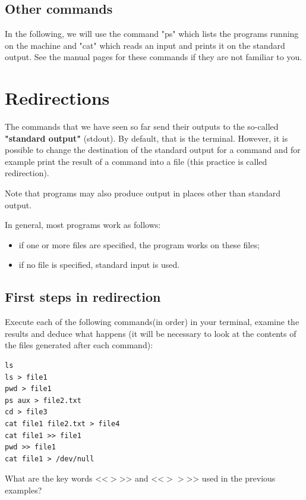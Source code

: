 \documentclass[11pt]{article}
\begin{document}
\subsection{Other commands}

In the following, we will use the command "ps" which lists the programs running on the machine and "cat" which reads an input and prints it on the standard output. See the manual pages for these commands if they are not familiar to you.

\section{Redirections}

The commands that we have seen so far send their outputs to the so-called \textbf{"standard output"} (stdout). By default, that is the terminal. However, it is possible to change the destination of the standard output for
a command and for example print the result of a command into a file (this practice is called redirection).

\noindent Note that programs may also produce output in places other than standard output.
\bigskip

\noindent In general, most programs work as follows:

\begin{itemize}
 \item if one or more files are specified, the program works on these files;
 \item if no file is specified, standard input is used.
\end{itemize}

\subsection{First steps in redirection}

Execute each of the following commands(in order) in your terminal, examine the results and deduce what happens (it will be necessary to look at the contents of the files generated after each command):


\begin{lstlisting}
ls
ls > file1
pwd > file1
ps aux > file2.txt
cd > file3
cat file1 file2.txt > file4
cat file1 >> file1
pwd >> file1
cat file1 > /dev/null
\end{lstlisting}

What are the key words <<$>$>> and <<$>>$>> used in the previous examples?
\end{document}
